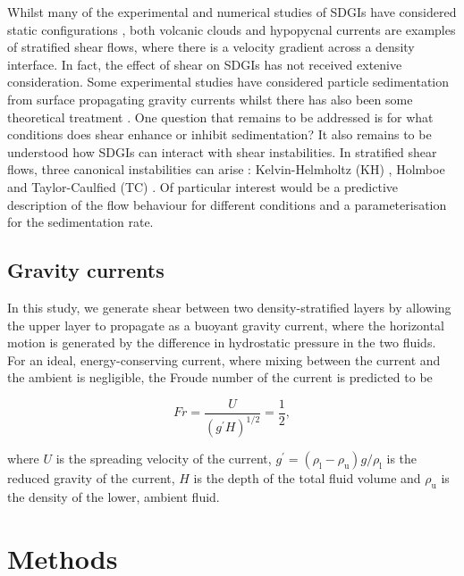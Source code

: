 \documentclass[authoryear,preprint,review,12pt]{elsarticle}
\begin{document}
Whilst many of the experimental and numerical studies of SDGIs have considered static configurations \citep{Chen97, Hoyal99, Blanchette05, Yu14, Burns15, Manzella15, Rouhnia15, Jazi16, Scollo17}, both volcanic clouds and hypopycnal currents are examples of stratified shear flows, where there is a velocity gradient across a density interface. In fact, the effect of shear on SDGIs has not received extenive consideration. Some experimental studies have considered particle sedimentation from surface propagating gravity currents \citep{Maxworthy99, Parsons01, McCool04, Sutherland18, Jazi19} whilst there has also been some theoretical treatment \citep{Farenzena17, Konopliv18}. One question that remains to be addressed is for what conditions does shear enhance or inhibit sedimentation? It also remains to be understood how SDGIs can interact with shear instabilities. In stratified shear flows, three canonical instabilities can arise \citep{Eaves19}: Kelvin-Helmholtz (KH) \citep{Helmholtz68, Kelvin71}, Holmboe \citep{Holmboe62} and Taylor-Caulfied (TC) \citep{Taylor31, Caulfield95}. Of particular interest would be a predictive description of the flow behaviour for different conditions and a parameterisation for the sedimentation rate.

\subsection{Gravity currents}
\label{subsec:grav_curr}

In this study, we generate shear between two density-stratified layers by allowing the upper layer to propagate as a buoyant gravity current, where the horizontal motion is generated by the difference in hydrostatic pressure in the two fluids. For an ideal, energy-conserving current, where mixing between the current and the ambient is negligible, the Froude number of the current is predicted to be \citep{Benjamin68}

\begin{equation}
  \label{equ:Froude}
  Fr = \frac{U}{(g^{\prime} H)^{1/2}} = \frac{1}{2},
\end{equation}

where $U$ is the spreading velocity of the current, $g^{\prime} = (\rho_{\text{l}} - \rho_{\text{u}}) g/ \rho_{\text{l}}$ is the reduced gravity of the current, $H$ is the depth of the total fluid volume and $\rho_{\text{u}}$ is the density of the lower, ambient fluid.
\section{Methods}
\label{sec:method}
\end{document}
